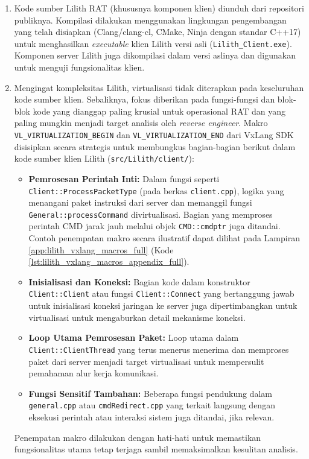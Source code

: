 \begin{enumerate}
    \item {} Kode sumber Lilith RAT (khususnya komponen klien) diunduh dari repositori publiknya. Kompilasi dilakukan menggunakan lingkungan pengembangan yang telah disiapkan (Clang/clang-cl, CMake, Ninja dengan standar C++17) untuk menghasilkan \textit{executable} klien Lilith versi asli (\texttt{Lilith\_Client.exe}). Komponen server Lilith juga dikompilasi dalam versi aslinya dan digunakan untuk menguji fungsionalitas klien.

    \item {}
    Mengingat kompleksitas Lilith, virtualisasi tidak diterapkan pada keseluruhan kode sumber klien. Sebaliknya, fokus diberikan pada fungsi-fungsi dan blok-blok kode yang dianggap paling krusial untuk operasional RAT dan yang paling mungkin menjadi target analisis oleh \textit{reverse engineer}. Makro \texttt{VL\_VIRTUALIZATION\_BEGIN} dan \texttt{VL\_VIRTUALIZATION\_END} dari VxLang SDK disisipkan secara strategis untuk membungkus bagian-bagian berikut dalam kode sumber klien Lilith (\texttt{src/Lilith/client/}):
    \begin{itemize}
        \item \textbf{Pemrosesan Perintah Inti:} Dalam fungsi seperti \texttt{Client::ProcessPacketType} (pada berkas \texttt{client.cpp}), logika yang menangani paket instruksi dari server dan memanggil fungsi \texttt{General::processCommand} divirtualisasi. Bagian yang memproses perintah CMD jarak jauh melalui objek \texttt{CMD::cmdptr} juga ditandai. Contoh penempatan makro secara ilustratif dapat dilihat pada Lampiran \ref{app:lilith_vxlang_macros_full} (Kode \ref{lst:lilith_vxlang_macros_appendix_full}).
        \item \textbf{Inisialisasi dan Koneksi:} Bagian kode dalam konstruktor \texttt{Client::Client} atau fungsi \texttt{Client::Connect} yang bertanggung jawab untuk inisialisasi koneksi jaringan ke server juga dipertimbangkan untuk virtualisasi untuk mengaburkan detail mekanisme koneksi.
        \item \textbf{Loop Utama Pemrosesan Paket:} Loop utama dalam \texttt{Client::ClientThread} yang terus menerus menerima dan memproses paket dari server menjadi target virtualisasi untuk mempersulit pemahaman alur kerja komunikasi.
        \item \textbf{Fungsi Sensitif Tambahan:} Beberapa fungsi pendukung dalam \texttt{general.cpp} atau \texttt{cmdRedirect.cpp} yang terkait langsung dengan eksekusi perintah atau interaksi sistem juga ditandai, jika relevan.
    \end{itemize}
    Penempatan makro dilakukan dengan hati-hati untuk memastikan fungsionalitas utama tetap terjaga sambil memaksimalkan kesulitan analisis.


\end{enumerate}
